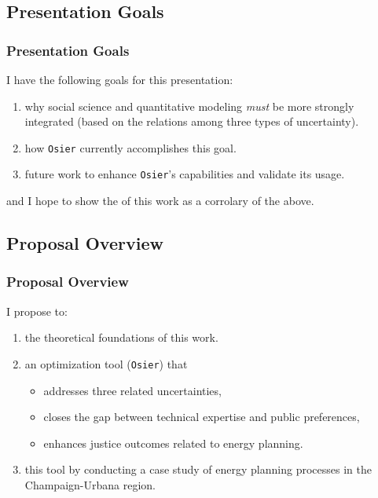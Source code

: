 \subsection{Presentation Goals}
\begin{frame}
    \frametitle{Presentation Goals}


    I have the following goals for this presentation:

    \begin{enumerate}
        \item {} why social science and quantitative modeling \textit{must} be more strongly integrated 
        (based on the relations among three types of uncertainty).
        \item {} how \texttt{Osier} currently accomplishes this goal.
        \item {} future work to enhance \texttt{Osier}'s capabilities and validate its usage.
    \end{enumerate}

    and I hope to show the  of this work as a corrolary of the above.

\end{frame}
\subsection{Proposal Overview}
\begin{frame}
    \frametitle{Proposal Overview}

    I propose to:

    \begin{enumerate}
        \item {} the theoretical foundations of this work.
        \item {} an optimization tool (\texttt{Osier}) that
        \begin{itemize}
            \item addresses three related uncertainties,
            \item closes the gap between technical expertise and public preferences,
            \item enhances justice outcomes related to energy planning.
        \end{itemize}
        \item {} this tool by conducting a case study of energy planning processes
        in the Champaign-Urbana region.
    \end{enumerate}

\end{frame}

